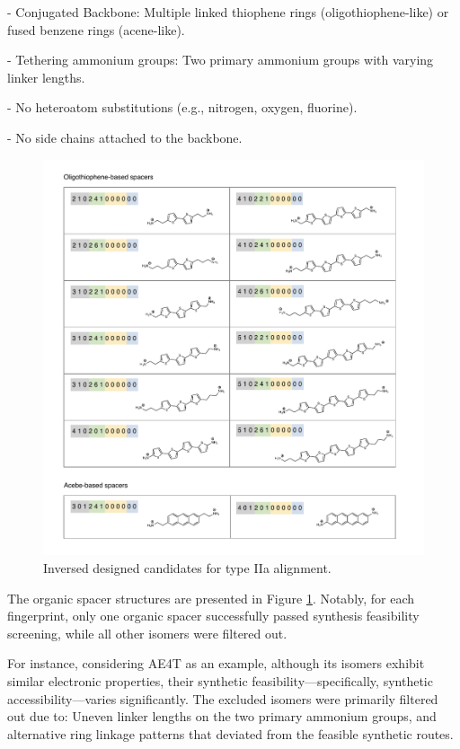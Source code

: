 -	Conjugated Backbone: Multiple linked thiophene rings (oligothiophene-like) or fused benzene rings (acene-like).

-	Tethering ammonium groups: Two primary ammonium groups with varying linker lengths.

-	No heteroatom substitutions (e.g., nitrogen, oxygen, fluorine).

-	No side chains attached to the backbone.

\begin{figure}[htbp]
    \centering
    \includegraphics[width=\textwidth]{figures/synthesis-feasibility/figure5-17.pdf}
    \caption{Inversed designed candidates for type IIa alignment.}
    \label{fig:figure5.17}
\end{figure}

The organic spacer structures are presented in Figure \ref{fig:figure5.17}. Notably, for each fingerprint, only one organic spacer successfully passed synthesis feasibility screening, while all other isomers were filtered out.

For instance, considering AE4T as an example, although its isomers exhibit similar electronic properties, their synthetic feasibility—specifically, synthetic accessibility—varies significantly. The excluded isomers were primarily filtered out due to: Uneven linker lengths on the two primary ammonium groups, and alternative ring linkage patterns that deviated from the feasible synthetic routes.

